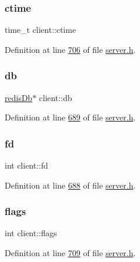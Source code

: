 \subsubsection{\texorpdfstring{ctime}{ctime}}
{\footnotesize\ttfamily time\+\_\+t client\+::ctime}



Definition at line \hyperlink{server_8h_source_l00706}{706} of file \hyperlink{server_8h_source}{server.\+h}.

\mbox{\label{structclient_a1a3871f1a657729e487cd5d92df32852}} 
\subsubsection{\texorpdfstring{db}{db}}
{\footnotesize\ttfamily \hyperlink{structredisDb}{redis\+Db}$\ast$ client\+::db}



Definition at line \hyperlink{server_8h_source_l00689}{689} of file \hyperlink{server_8h_source}{server.\+h}.

\mbox{\label{structclient_aa9ee781ac58a0d10fa591a570e875473}} 
\subsubsection{\texorpdfstring{fd}{fd}}
{\footnotesize\ttfamily int client\+::fd}



Definition at line \hyperlink{server_8h_source_l00688}{688} of file \hyperlink{server_8h_source}{server.\+h}.

\mbox{\label{structclient_a723d126cff0bc975611574cd0004e85a}} 
\subsubsection{\texorpdfstring{flags}{flags}}
{\footnotesize\ttfamily int client\+::flags}



Definition at line \hyperlink{server_8h_source_l00709}{709} of file \hyperlink{server_8h_source}{server.\+h}.

\mbox{\label{structclient_a3fc8ca078a7db08fb2bd7fd2f3dfcdc6}} 
